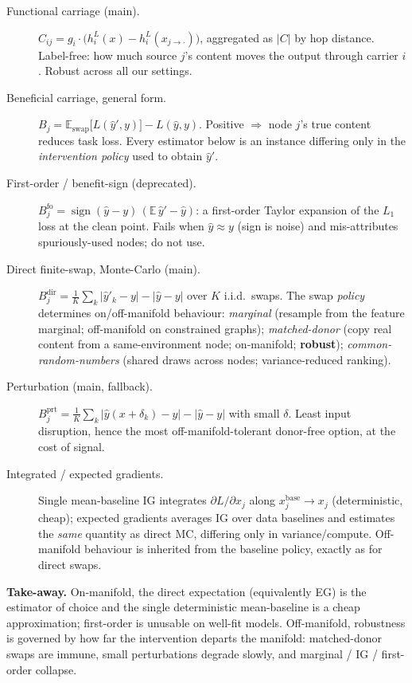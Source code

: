 \begin{description}
\item[Functional carriage (main).] $C_{ij}=g_i\!\cdot\!\big(h^{L}_i(x)-h^{L}_i(x_{j\to\cdot})\big)$,
  aggregated as $|C|$ by hop distance. Label-free: how much source $j$'s content moves the output
  through carrier $i$. Robust across all our settings.

\item[Beneficial carriage, general form.] $B_j=\mathbb{E}_{\text{swap}}\!\big[L(\hat y',y)\big]-L(\hat y,y)$.
  Positive $\Rightarrow$ node $j$'s true content reduces task loss. Every estimator below is an
  instance differing only in the \emph{intervention policy} used to obtain $\hat y'$.

\item[First-order / benefit-sign (deprecated).]
  $B^{\text{fo}}_j=\operatorname{sign}(\hat y-y)\,(\mathbb{E}\,\hat y'-\hat y)$: a first-order Taylor
  expansion of the $L_1$ loss at the clean point. Fails when $\hat y\!\approx\!y$ (sign is noise) and
  mis-attributes spuriously-used nodes; do not use.

\item[Direct finite-swap, Monte-Carlo (main).]
  $B^{\text{dir}}_j=\tfrac1K\sum_k |\hat y'_k-y|-|\hat y-y|$ over $K$ i.i.d.\ swaps. The swap
  \emph{policy} determines on/off-manifold behaviour:
  \emph{marginal} (resample from the feature marginal; off-manifold on constrained graphs);
  \emph{matched-donor} (copy real content from a same-environment node; on-manifold; \textbf{robust});
  \emph{common-random-numbers} (shared draws across nodes; variance-reduced ranking).

\item[Perturbation (main, fallback).]
  $B^{\text{prt}}_j=\tfrac1K\sum_k |\hat y(x+\delta_k)-y|-|\hat y-y|$ with small $\delta$. Least
  input disruption, hence the most off-manifold-tolerant donor-free option, at the cost of signal.

\item[Integrated / expected gradients.]
  Single mean-baseline IG integrates $\partial L/\partial x_j$ along $x_j^{\text{base}}\!\to\!x_j$
  (deterministic, cheap); expected gradients averages IG over data baselines and estimates the
  \emph{same} quantity as direct MC, differing only in variance/compute. Off-manifold behaviour is
  inherited from the baseline policy, exactly as for direct swaps.
\end{description}

\noindent\textbf{Take-away.} On-manifold, the direct expectation (equivalently EG) is the estimator
of choice and the single deterministic mean-baseline is a cheap approximation; first-order is
unusable on well-fit models. Off-manifold, robustness is governed by how far the intervention
departs the manifold: matched-donor swaps are immune, small perturbations degrade slowly, and
marginal / IG / first-order collapse.
